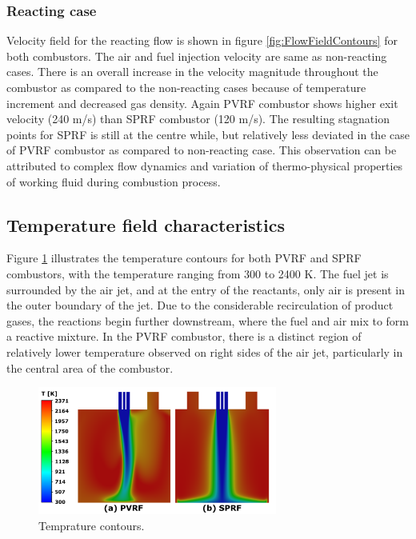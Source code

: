 \subsubsection{Reacting case}

Velocity field for the reacting flow is shown in figure \ref{fig:FlowFieldContours} for both combustors. The air and fuel injection velocity are same as non-reacting cases. There is an overall increase in the velocity magnitude throughout the combustor as compared to the non-reacting cases because of temperature increment and decreased gas density. Again PVRF combustor shows higher exit velocity (240 m/s) than SPRF combustor (120 m/s). The resulting stagnation points for SPRF is still at the centre while, but relatively less deviated in the case of PVRF combustor as compared to non-reacting case. This observation can be attributed to complex flow dynamics and variation of thermo-physical properties of working fluid during combustion process. 

\subsection{Temperature field characteristics}
Figure \ref{TempContours} illustrates the temperature contours for both PVRF and SPRF combustors, with the temperature ranging from 300 to 2400 K. The fuel jet is surrounded by the air jet, and at the entry of the reactants, only air is present in the outer boundary of the jet. Due to the considerable recirculation of product gases, the reactions begin further downstream, where the fuel and air mix to form a reactive mixture. In the PVRF combustor, there is a distinct region of relatively lower temperature observed on right sides of the air jet, particularly in the central area of the combustor.

\begin{figure}[h!]
	\centering
        \includegraphics[width=0.7\textwidth]{Chapter5/Images/Numerical/Contours/temp_contsReacting.png}
	\caption{Temprature contours.}
	\label{TempContours}
\end{figure}

